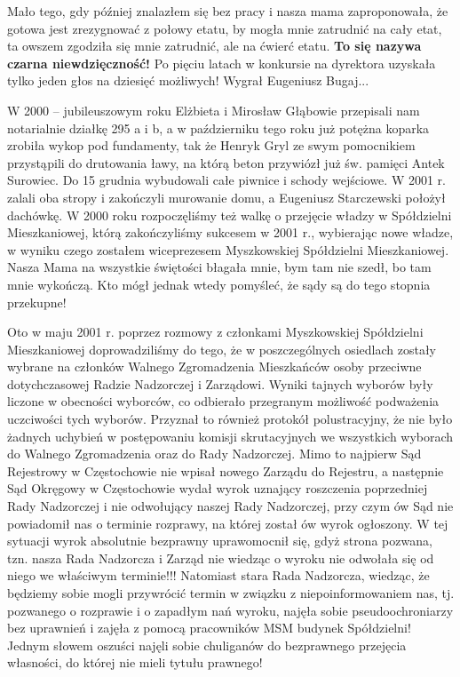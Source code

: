 Mało tego, gdy później znalazłem się bez pracy i nasza mama zaproponowała, że gotowa jest zrezygnować z połowy etatu, by mogła mnie zatrudnić na cały etat, ta owszem zgodziła się mnie zatrudnić, ale na ćwierć etatu. \textbf{To się nazywa czarna niewdzięczność!} Po pięciu latach w konkursie na dyrektora uzyskała tylko jeden głos na dziesięć możliwych! Wygrał Eugeniusz Bugaj...

W 2000 – jubileuszowym roku Elżbieta i Mirosław Głąbowie przepisali nam notarialnie działkę 295 a i b, a w październiku tego roku już potężna koparka zrobiła wykop pod fundamenty, tak że Henryk Gryl ze swym pomocnikiem przystąpili do drutowania ławy, na którą beton przywiózł już św. pamięci Antek Surowiec. Do 15 grudnia wybudowali całe piwnice i schody wejściowe. W 2001 r. zalali oba stropy i zakończyli murowanie domu, a Eugeniusz Starczewski położył dachówkę. W 2000 roku rozpoczęliśmy też walkę o przejęcie władzy w Spółdzielni Mieszkaniowej, którą zakończyliśmy sukcesem w 2001 r., wybierając nowe władze, w wyniku czego zostałem wiceprezesem Myszkowskiej Spółdzielni Mieszkaniowej. Nasza Mama na wszystkie świętości błagała mnie, bym tam nie szedł, bo tam mnie wykończą. Kto mógł jednak wtedy pomyśleć, że sądy są do tego stopnia przekupne!

Oto w maju 2001 r. poprzez rozmowy z członkami Myszkowskiej Spółdzielni Mieszkaniowej doprowadziliśmy do tego, że w poszczególnych osiedlach zostały wybrane na członków Walnego Zgromadzenia Mieszkańców osoby przeciwne dotychczasowej Radzie Nadzorczej i Zarządowi. Wyniki tajnych wyborów były liczone w obecności wyborców, co odbierało przegranym możliwość podważenia uczciwości tych wyborów. Przyznał to również  protokół polustracyjny, że nie było żadnych uchybień w postępowaniu komisji skrutacyjnych we wszystkich wyborach do Walnego Zgromadzenia oraz do Rady Nadzorczej. Mimo to najpierw Sąd Rejestrowy w Częstochowie nie wpisał nowego Zarządu do Rejestru, a następnie Sąd Okręgowy w Częstochowie wydał wyrok uznający roszczenia poprzedniej Rady Nadzorczej i nie odwołujący naszej Rady Nadzorczej, przy czym ów Sąd nie powiadomił nas o terminie rozprawy, na której został ów wyrok ogłoszony. W tej sytuacji wyrok absolutnie bezprawny uprawomocnił się, gdyż strona pozwana, tzn. nasza Rada Nadzorcza i Zarząd nie wiedząc o wyroku nie odwołała się od niego we właściwym terminie!!! Natomiast stara Rada Nadzorcza, wiedząc, że będziemy sobie mogli przywrócić termin w związku z niepoinformowaniem nas, tj. pozwanego o rozprawie i o zapadłym nań wyroku, najęła sobie pseudoochroniarzy bez uprawnień i zajęła z pomocą pracowników MSM budynek Spółdzielni! Jednym słowem oszuści najęli sobie chuliganów do bezprawnego przejęcia własności, do której nie mieli tytułu prawnego!

